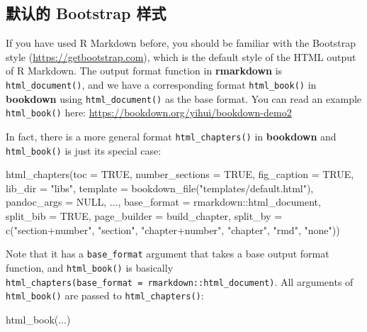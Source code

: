 \documentclass[
  12pt,
]{krantz}
\newenvironment{Shaded}{\begin{snugshade}}{\end{snugshade}}
\newcommand{\AttributeTok}[1]{\textcolor[rgb]{0.77,0.63,0.00}{#1}}
\newcommand{\ConstantTok}[1]{\textcolor[rgb]{0.00,0.00,0.00}{#1}}
\newcommand{\FunctionTok}[1]{\textcolor[rgb]{0.00,0.00,0.00}{#1}}
\newcommand{\NormalTok}[1]{#1}
\newcommand{\SpecialCharTok}[1]{\textcolor[rgb]{0.00,0.00,0.00}{#1}}
\newcommand{\StringTok}[1]{\textcolor[rgb]{0.31,0.60,0.02}{#1}}
\theoremstyle{definition}
\theoremstyle{definition}
\theoremstyle{definition}
\theoremstyle{definition}
\theoremstyle{remark}
\begin{document}
\hypertarget{bootstrap-style}{%
\subsection{默认的 Bootstrap 样式}\label{bootstrap-style}}

If you have used R Markdown before, you should be familiar with the Bootstrap style (\url{https://getbootstrap.com}), which is the default style of the HTML output of R Markdown. The output format function in \textbf{rmarkdown} is \texttt{html\_document()}, and we have a corresponding format \texttt{html\_book()} in \textbf{bookdown} using \texttt{html\_document()} as the base format. You can read an example \texttt{html\_book()} here: \url{https://bookdown.org/yihui/bookdown-demo2}

In fact, there is a more general format \texttt{html\_chapters()} in \textbf{bookdown} and \texttt{html\_book()} is just its special case:

\begin{Shaded}
\begin{Highlighting}[]
\FunctionTok{html\_chapters}\NormalTok{(}\AttributeTok{toc =} \ConstantTok{TRUE}\NormalTok{, }\AttributeTok{number\_sections =} \ConstantTok{TRUE}\NormalTok{,}
  \AttributeTok{fig\_caption =} \ConstantTok{TRUE}\NormalTok{, }\AttributeTok{lib\_dir =} \StringTok{"libs"}\NormalTok{,}
  \AttributeTok{template =} \FunctionTok{bookdown\_file}\NormalTok{(}\StringTok{"templates/default.html"}\NormalTok{),}
  \AttributeTok{pandoc\_args =} \ConstantTok{NULL}\NormalTok{, ...,}
  \AttributeTok{base\_format =}\NormalTok{ rmarkdown}\SpecialCharTok{::}\NormalTok{html\_document,}
  \AttributeTok{split\_bib =} \ConstantTok{TRUE}\NormalTok{, }\AttributeTok{page\_builder =}\NormalTok{ build\_chapter,}
  \AttributeTok{split\_by =} \FunctionTok{c}\NormalTok{(}\StringTok{"section+number"}\NormalTok{, }\StringTok{"section"}\NormalTok{, }\StringTok{"chapter+number"}\NormalTok{, }\StringTok{"chapter"}\NormalTok{, }\StringTok{"rmd"}\NormalTok{, }\StringTok{"none"}\NormalTok{))}
\end{Highlighting}
\end{Shaded}

Note that it has a \texttt{base\_format} argument that takes a base output format function, and \texttt{html\_book()} is basically \texttt{html\_chapters(base\_format\ =\ rmarkdown::html\_document)}. All arguments of \texttt{html\_book()} are passed to \texttt{html\_chapters()}:

\begin{Shaded}
\begin{Highlighting}[]
\FunctionTok{html\_book}\NormalTok{(...)}
\end{Highlighting}
\end{Shaded}
\end{document}

